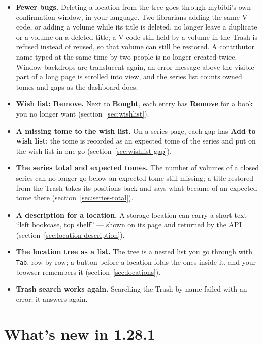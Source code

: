 \begin{itemize}
        (section~\ref{sec:health-watch}). Nothing is written to the
        database; a restart sets the counts to zero.
  \item \textbf{Fewer bugs.} Deleting a location from the tree goes
        through mybibli's own confirmation window, in your language.
        Two librarians adding the same V-code, or adding a volume while
        its title is deleted, no longer leave a duplicate or a volume
        on a deleted title; a V-code still held by a volume in the
        Trash is refused instead of reused, so that volume can still be
        restored. A contributor name typed at the same time by two
        people is no longer created twice. Window backdrops are
        translucent again, an error message above the visible part of a
        long page is scrolled into view, and the series list counts
        owned tomes and gaps as the dashboard does.
  \item \textbf{Wish list: Remove.} Next to \textbf{Bought}, each entry
        has \textbf{Remove} for a book you no longer want
        (section~\ref{sec:wishlist}).
  \item \textbf{A missing tome to the wish list.} On a series page, each
        gap has \textbf{Add to wish list}: the tome is recorded as an
        expected tome of the series and put on the wish list in one go
        (section~\ref{sec:wishlist-gap}).
  \item \textbf{The series total and expected tomes.} The number of
        volumes of a closed series can no longer go below an expected
        tome still missing; a title restored from the Trash takes its
        positions back and says what became of an expected tome there
        (section~\ref{sec:series-total}).
  \item \textbf{A description for a location.} A storage location can
        carry a short text --- ``left bookcase, top shelf'' --- shown on
        its page and returned by the API
        (section~\ref{sec:location-description}).
  \item \textbf{The location tree as a list.} The tree is a nested list
        you go through with \texttt{Tab}, row by row; a button before a
        location folds the ones inside it, and your browser remembers
        it (section~\ref{sec:locations}).
  \item \textbf{Trash search works again.} Searching the Trash by name
        failed with an error; it answers again.
\end{itemize}

\section{What's new in 1.28.1}\label{sec:whats-new-1.28.1}

